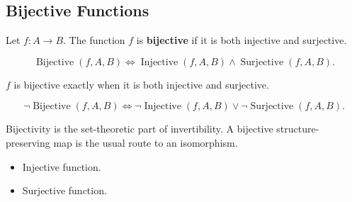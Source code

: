 \subsection{Bijective Functions}
\label{subsec:bijective-functions}

\begin{tcolorbox}[title={Definition --- Bijective}]
\begin{definition}
\label{def:alg-bijective}
Let $f:A\to B$.
The function $f$ is \textbf{bijective} if it is both injective and surjective.
\end{definition}
\end{tcolorbox}

\begin{remark*}
\[
\operatorname{Bijective}(f,A,B)
\Longleftrightarrow
\operatorname{Injective}(f,A,B)\land \operatorname{Surjective}(f,A,B).
\]
\end{remark*}

\begin{remark*}
$f$ is bijective exactly when it is both injective and surjective.
\end{remark*}

\begin{remark*}
\[
\neg\operatorname{Bijective}(f,A,B)
\Longleftrightarrow
\neg\operatorname{Injective}(f,A,B)
\lor
\neg\operatorname{Surjective}(f,A,B).
\]
\end{remark*}

\begin{remark*}[Interpretation]
Bijectivity is the set-theoretic part of invertibility.  A bijective
structure-preserving map is the usual route to an isomorphism.
\end{remark*}

\begin{remark*}[Dependencies]
\begin{itemize}
  \item Injective function.
  \item Surjective function.
\end{itemize}
\end{remark*}
